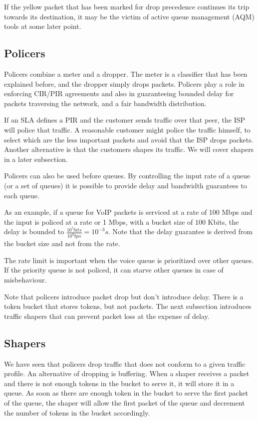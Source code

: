 If the yellow packet that has been marked for drop precedence continues its trip towards its destination, it may be the victim of active queue management (AQM) tools at some later point.

\subsection{Policers}

Policers combine a meter and a dropper.
The meter is a classifier that has been explained before, and the dropper simply drops packets.
Policers play a role in enforcing CIR/PIR agreements and also in guaranteeing bounded delay for packets traversing the network, and a fair bandwidth distribution.

If an SLA defines a PIR and the customer sends traffic over that peer, the ISP will police that traffic.
A reasonable customer might police the traffic himself, to select which are the less important packets and avoid that the ISP drops packets.
Another alternative is that the customers shapes its traffic.
We will cover shapers in a later subsection.

Policers can also be used before queues.
By controlling the input rate of a queue (or a set of queues) it is possible to provide delay and bandwidth guarantees to each queue.

As an example, if a queue for VoIP packets is serviced at a rate of 100 Mbps and the input is policed at a rate or 1 Mbps, with a bucket size of 100 Kbits, the  delay is bounded to $\frac{10^5 bits}{10^8 bps} = 10^{-3}s$.
Note that the delay guarantee is derived from the bucket size and not from the rate.

The rate limit is important when the voice queue is prioritized over other queues.
If the priority queue is not policed, it can starve other queues in case of misbehaviour.

Note that policers introduce packet drop but don't introduce delay.
There is a token bucket that stores tokens, but not packets.
The next subsection introduces traffic shapers that can prevent packet loss at the expense of delay.

\subsection{Shapers}

We have seen that policers drop traffic that does not conform to a given traffic profile.
An alternative of dropping is buffering.
When a shaper receives a packet and there is not enough tokens in the bucket to serve it, it will store it in a queue.
As soon as there are enough token in the bucket to serve the first packet of the queue, the shaper will allow the first packet of the queue and decrement the number of tokens in the bucket accordingly.

